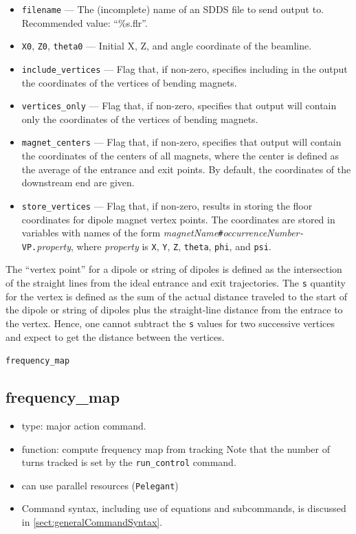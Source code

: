 \documentclass[11pt]{article}
\begin{document}
\begin{itemize}
\item \verb|filename| --- The (incomplete) name of an SDDS file to send output to.  
 Recommended value: ``\%s.flr''.
\item \verb|X0|, \verb|Z0|, \verb|theta0| --- Initial X, Z, and angle coordinate of the beamline.
\item \verb|include_vertices| --- Flag that, if non-zero, specifies including  in the output
the coordinates of the vertices of bending magnets. 
\item \verb|vertices_only| --- Flag that, if non-zero, specifies that output will contain only
the coordinates of the vertices of bending magnets. 
\item \verb|magnet_centers| --- Flag that, if non-zero, specifies that output will contain 
the coordinates of the centers of all magnets, where the center is defined as the average of the
entrance and exit points. By default, the coordinates of the downstream
end are given.
\item \verb|store_vertices| --- Flag that, if non-zero, results in storing the floor coordinates for
  dipole magnet vertex points. The coordinates are stored in variables with names of the form
  {\em magnetName}\verb|#|{\em occurrenceNumber}\verb|-VP.|{\em property}, where {\em property}
  is \verb|X|, \verb|Y|, \verb|Z|, \verb|theta|, \verb|phi|, and \verb|psi|.
\end{itemize}

The ``vertex  point'' for a dipole or string of dipoles is defined as the intersection of the
straight lines from the ideal entrance and exit trajectories. 
The \verb|s| quantity for the vertex is defined as the sum of the actual distance traveled to the
start of the dipole or string of dipoles plus the straight-line distance from the entrace to the
vertex. 
Hence, one cannot subtract the \verb|s| values for two successive vertices and expect to get the
distance between the vertices.

\newpage
\begin{center}{\Large\verb|frequency_map|}\end{center}
\subsection{frequency\_map \label{subsec:frequencymap}}

\begin{itemize}
\item type: major action command.  
\item function: compute frequency map from tracking
      Note that the number of turns tracked is set by the \verb|run_control| command.
\item can use parallel resources (\verb|Pelegant|)
\item Command syntax, including use of equations and subcommands, is discussed in \ref{sect:generalCommandSyntax}.
\end{itemize}
\end{document}
